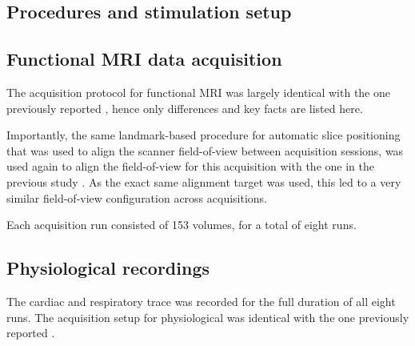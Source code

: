 \subsection*{Procedures and stimulation setup}

\subsection*{Functional MRI data acquisition}

The acquisition protocol for functional MRI was largely identical with the one
previously reported \cite{Hanke_2014}, hence only differences and key facts are
listed here.

Importantly, the same landmark-based procedure for automatic slice positioning
that was used to align the scanner field-of-view between acquisition sessions,
was used again to align the field-of-view for this acquisition with the one in
the previous study \cite{Hanke_2014}. As the exact same alignment target was
used, this led to a very similar field-of-view configuration across
acquisitions.

Each acquisition run consisted of 153 volumes, for a total of eight runs.

\subsection*{Physiological recordings}

The cardiac and respiratory trace was recorded for the full duration of all
eight runs. The acquisition setup for physiological was identical with the one
previously reported \cite{Hanke_2014}.
